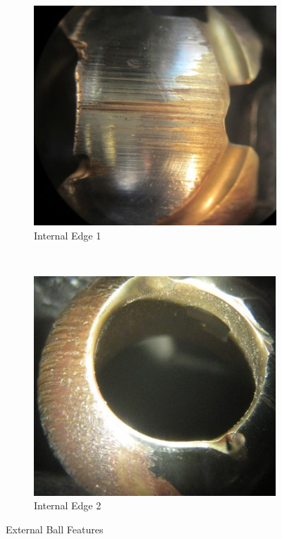 \documentclass[]{article}
\begin{document}
\begin{figure}
	\begin{subfigure}[h]{0.4\textwidth}
		\includegraphics[width=\textwidth]{Photos/ball_internal_edge_1}
		\caption{Internal Edge 1}
		\label{fig:Internal edge 1}
	\end{subfigure}
	~
	\begin{subfigure}[h]{0.4\textwidth}
	\includegraphics[width=\textwidth]{Photos/ball_internal_edge_2}
		\caption{Internal Edge 2}
		\label{fig:Internal edge 2}
	\end{subfigure}
	\caption{External Ball Features}\label{fig:ball}
\end{figure}
\end{document}
